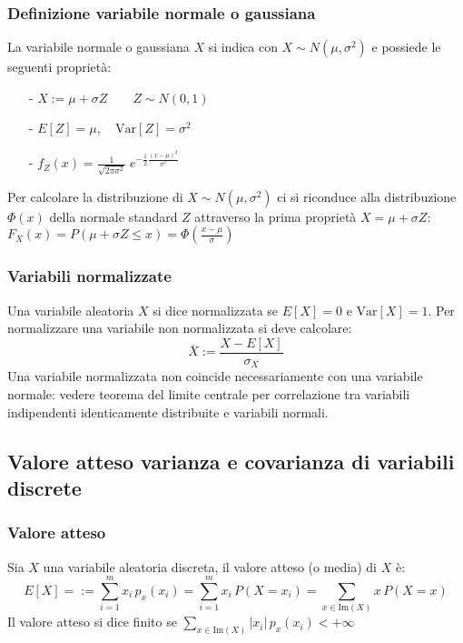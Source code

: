 \documentclass[a4paper]{article}
\newcommand\var{\text{Var}}   %
\begin{document}
\subsubsection*{Definizione variabile normale o gaussiana}
La variabile normale o gaussiana \(X\) si indica con \(X \sim N(\mu,\sigma^2)\) e possiede le seguenti proprietà:
\begin{itemize}[topsep=3pt, itemsep=0pt]
	\item[-] \(X := \mu + \sigma Z \qquad Z \sim N(0,1)\)
	\item[-] \(E[Z] = \mu, \quad \var[Z] = \sigma^2\)
	\item[-] \(\displaystyle f_Z(x) = \frac{1}{\sqrt{2 \pi \sigma^2}} \; e^{-\frac{1}{2} \frac{(x-\mu)^2}{\sigma^2}}\)
\end{itemize}
Per calcolare la distribuzione di \(X \sim N(\mu,\sigma^2)\) ci si riconduce alla distribuzione \(\Phi(x)\) della normale standard \(Z\)
attraverso la prima proprietà \(X = \mu + \sigma Z\): \(F_X(x) = P(\mu + \sigma Z \leq x) = \Phi(\frac{x - \mu}{\sigma})\)

\subsubsection*{Variabili normalizzate}
Una variabile aleatoria \(X\) si dice normalizzata se \(E[X] = 0\) e \(\var[X] = 1\). Per normalizzare una variabile non normalizzata
si deve calcolare: \[ \overline{X} := \frac{X - E[X]}{\sigma_X}\]
Una variabile normalizzata non coincide necessariamente con una variabile normale: vedere teorema del limite centrale per correlazione
tra variabili indipendenti identicamente distribuite e variabili normali.

\newpage

\subsection{Valore atteso varianza e covarianza di variabili discrete}
\subsubsection*{Valore atteso}
Sia \(X\) una variabile aleatoria discreta, il valore atteso (o media) di \(X\) è:
\[E[X] = := \sum_{i=1}^m x_i \, p_x(x_i) = \sum_{i=1}^m x_i \, P(X = x_i) = \sum_{x \in \text{Im}(X)} x \, P(X = x)\]
Il valore atteso si dice finito se \(\displaystyle \sum_{x \in \text{Im}(X)} |x_i| \, p_x(x_i) < +\infty\)
\end{document}
